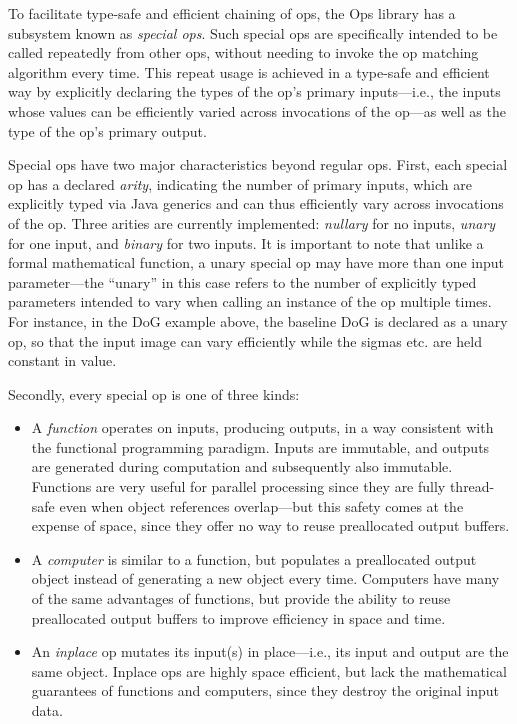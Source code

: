 \documentclass{bmcart}
\begin{document}
To facilitate type-safe and efficient chaining of ops, the Ops library has a
subsystem known as \textit{special ops}. Such special ops are specifically
intended to be called repeatedly from other ops, without needing to invoke the
op matching algorithm every time. This repeat usage is achieved in a type-safe
and efficient way by explicitly declaring the types of the op's primary
inputs---i.e., the inputs whose values can be efficiently varied across
invocations of the op---as well as the type of the op's primary output.

Special ops have two major characteristics beyond regular ops. First, each
special op has a declared \textit{arity}, indicating the number of primary
inputs, which are explicitly typed via Java generics and can thus efficiently
vary across invocations of the op. Three arities are currently implemented:
\textit{nullary} for no inputs, \textit{unary} for one input, and
\textit{binary} for two inputs. It is important to note that unlike a formal
mathematical function, a unary special op may have more than one input
parameter---the ``unary'' in this case refers to the number of explicitly typed
parameters intended to vary when calling an instance of the op multiple times.
For instance, in the DoG example above, the baseline DoG is declared as a unary
op, so that the input image can vary efficiently while the sigmas etc. are held
constant in value.

Secondly, every special op is one of three kinds:

\begin{itemize}
  \item A \textit{function} operates on inputs, producing outputs, in a way
    consistent with the functional programming paradigm. Inputs are immutable,
    and outputs are generated during computation and subsequently also
    immutable. Functions are very useful for parallel processing since they are
    fully thread-safe even when object references overlap---but this safety
    comes at the expense of space, since they offer no way to reuse
    preallocated output buffers.
  \item A \textit{computer} is similar to a function, but populates a
    preallocated output object instead of generating a new object every time.
    Computers have many of the same advantages of functions, but provide the
    ability to reuse preallocated output buffers to improve efficiency in space
    and time.
  \item An \textit{inplace} op mutates its input(s) in place---i.e., its input
    and output are the same object. Inplace ops are highly space efficient, but
    lack the mathematical guarantees of functions and computers, since they
    destroy the original input data.
\end{itemize}
\end{document}
